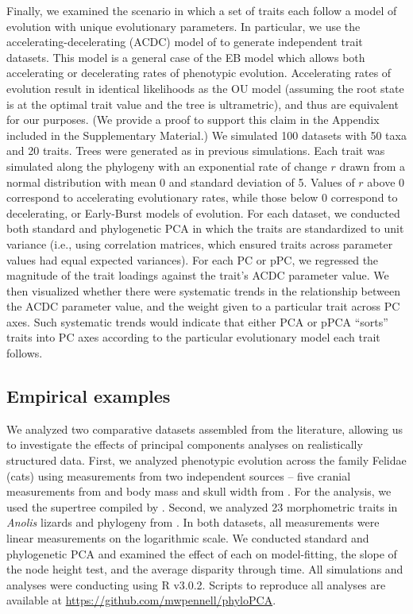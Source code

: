 \documentclass[a4paper,11pt]{article}
\begin{document}
Finally, we examined the scenario in which a set of traits each follow a model of evolution with unique evolutionary parameters. In particular, we use the accelerating-decelerating (ACDC) model of \citet{Blomberg2003} to generate independent trait datasets. This model is a general case of the EB model which allows both accelerating or decelerating rates of phenotypic evolution. Accelerating rates of evolution result in identical likelihoods as the OU model (assuming the root state is at the optimal trait value and the tree is ultrametric), and thus are equivalent for our purposes. (We provide a proof to support this claim in the Appendix included in the Supplementary Material.) We simulated 100 datasets with 50 taxa and 20 traits. Trees were generated as in previous simulations. Each trait was simulated along the phylogeny with an exponential rate of change $r$ drawn from a normal distribution with mean 0 and standard deviation of 5. Values of $r$ above 0 correspond to accelerating evolutionary rates, while those below 0 correspond to decelerating, or Early-Burst models of evolution. For each dataset, we conducted both standard and phylogenetic PCA in which the traits are standardized to unit variance (i.e., using correlation matrices, which ensured traits across parameter values had equal expected variances). For each PC or pPC, we regressed the magnitude of the trait loadings against the trait's ACDC parameter value. We then visualized whether there were systematic trends in the relationship between the ACDC parameter value, and the weight given to a particular trait across PC axes. Such systematic trends would indicate that either PCA or pPCA ``sorts'' traits into PC axes according to the particular evolutionary model each trait follows.

\subsection{Empirical examples}
We analyzed two comparative datasets assembled from the literature, allowing us to investigate the effects of principal components analyses on realistically structured data. First, we analyzed phenotypic evolution across the family Felidae (cats) using measurements from two independent sources -- five cranial measurements from \cite{slater_2009} and body mass and skull width from \cite{sakamoto_2010}. For the analysis, we used the supertree compiled by \cite{Nyakatura_2012}. Second, we analyzed 23 morphometric traits in \textit{Anolis} lizards and phylogeny from \cite{Mahler2010}. In both datasets, all measurements were linear measurements on the logarithmic scale. We conducted standard and phylogenetic PCA and examined the effect of each on model-fitting, the slope of the node height test, and the average disparity through time. All simulations and analyses were conducting using R v3.0.2. Scripts to reproduce all analyses are available at \url{https://github.com/mwpennell/phyloPCA}.
  
\end{document}
